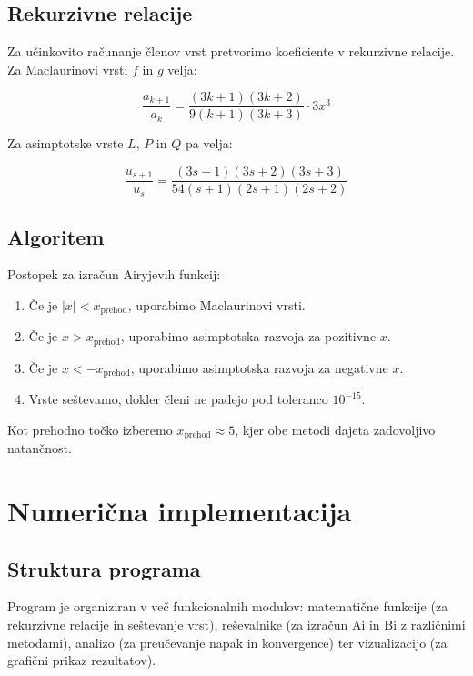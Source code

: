 \documentclass[12pt,a4paper]{article}
\newcommand{\Ai}{\mathrm{Ai}}
\newcommand{\Bi}{\mathrm{Bi}}
\begin{document}
\subsection{Rekurzivne relacije}
Za učinkovito računanje členov vrst pretvorimo koeficiente v rekurzivne relacije. Za Maclaurinovi vrsti $f$ in $g$ velja:

\begin{equation}
\frac{a_{k+1}}{a_k} = \frac{(3k+1)(3k+2)}{9(k+1)(3k+3)} \cdot 3x^3
\end{equation}

Za asimptotske vrste $L$, $P$ in $Q$ pa velja:

\begin{equation}
\frac{u_{s+1}}{u_s} = \frac{(3s+1)(3s+2)(3s+3)}{54(s+1)(2s+1)(2s+2)}
\end{equation}

\subsection{Algoritem}
Postopek za izračun Airyjevih funkcij:

\begin{enumerate}
\item Če je $|x| < x_{\text{prehod}}$, uporabimo Maclaurinovi vrsti.
\item Če je $x > x_{\text{prehod}}$, uporabimo asimptotska razvoja za pozitivne $x$.
\item Če je $x < -x_{\text{prehod}}$, uporabimo asimptotska razvoja za negativne $x$.
\item Vrste seštevamo, dokler členi ne padejo pod toleranco $10^{-15}$.
\end{enumerate}

Kot prehodno točko izberemo $x_{\text{prehod}} \approx 5$, kjer obe metodi dajeta zadovoljivo natančnost.

\section{Numerična implementacija}

\subsection{Struktura programa}
Program je organiziran v več funkcionalnih modulov: matematične funkcije (za rekurzivne relacije in seštevanje vrst), reševalnike (za izračun $\Ai$ in $\Bi$ z različnimi metodami), analizo (za preučevanje napak in konvergence) ter vizualizacijo (za grafični prikaz rezultatov).
\end{document}
